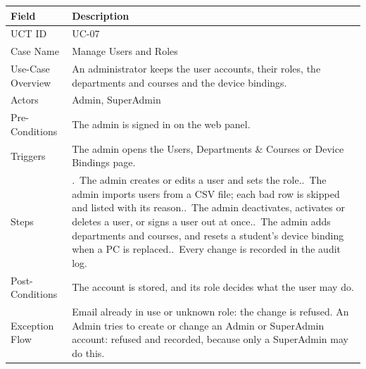 \begin{lrbox}{\uctbox}{\small\renewcommand{\arraystretch}{1.1}\setlength{\tabcolsep}{6pt}%
\begin{tabular}{>{\raggedright\arraybackslash}p{3.6cm}>{\raggedright\arraybackslash}p{\dimexpr\textwidth-3.6cm-4\tabcolsep\relax}}
\hline\hline
\textbf{Field} & \textbf{Description} \\ \hline
UCT ID & UC-07 \\
Case Name & Manage Users and Roles \\
Use-Case Overview & An administrator keeps the user accounts, their roles, the departments and courses and the device bindings. \\
Actors & Admin, SuperAdmin \\
Pre-Conditions & The admin is signed in on the web panel. \\
Triggers & The admin opens the Users, Departments \& Courses or Device Bindings page. \\
Steps & 1.~The admin creates or edits a user and sets the role.\newline
2.~The admin imports users from a CSV file; each bad row is skipped and listed with its reason.\newline
3.~The admin deactivates, activates or deletes a user, or signs a user out at once.\newline
4.~The admin adds departments and courses, and resets a student's device binding when a PC is replaced.\newline
5.~Every change is recorded in the audit log. \\
Post-Conditions & The account is stored, and its role decides what the user may do. \\
Exception Flow & Email already in use or unknown role: the change is refused. An Admin tries to create or change an Admin or SuperAdmin account: refused and recorded, because only a SuperAdmin may do this. \\
\hline\hline
\end{tabular}}\end{lrbox}
\begin{table}[H]
\centering
\caption{Use Case Table for Manage Users and Roles}\label{tab:uc07}
\vspace{4pt}
\usebox{\uctbox}
\end{table}

